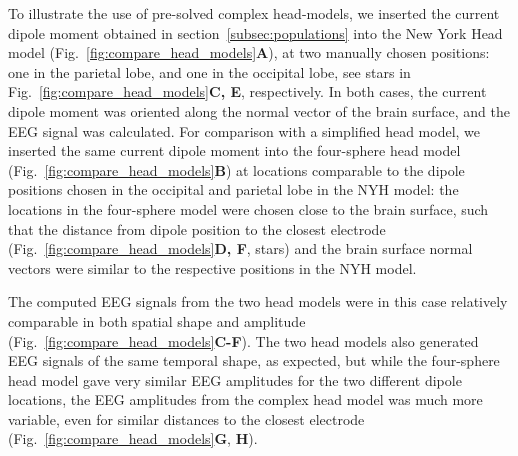 \documentclass[preprint,10pt,authoryear]{elsarticle}
\newcommand{\hlb}[2][NavyBlue]{ {\sethlcolor{#1} \hl{#2}} }
\newcommand{\hlg}[2][Emerald]{ {\sethlcolor{#1} \hl{#2}} }
\newcommand{\snnote}[1]{\color{white}{\hlb{SN: #1 }}\color{black}}
\newcommand{\tvnnote}[1]{\color{white}{\hlg{TVN: #1 }}\color{black}}
\begin{document}

To illustrate the use of pre-solved complex head-models, we inserted the current dipole moment obtained in section~\ref{subsec:populations} into the New York Head model (Fig.~\ref{fig:compare_head_models}\textbf{A}), at two manually chosen positions: one in the parietal lobe, and one in the occipital lobe, see stars in Fig.~\ref{fig:compare_head_models}\textbf{C, E}, respectively.
	In both cases, the current dipole moment was oriented along the normal vector of the brain surface, and the EEG signal was calculated.
For comparison with a simplified head model, we inserted the same current dipole moment into the four-sphere head model  (Fig.~\ref{fig:compare_head_models}\textbf{B}) at locations comparable to the dipole positions chosen in the occipital and parietal lobe in the NYH model: the locations in the four-sphere model were chosen close to the brain surface, such that the distance from dipole position to the closest electrode (Fig.~\ref{fig:compare_head_models}\textbf{D, F}, stars) and the brain surface normal vectors were similar to the respective positions in the NYH model.

The computed EEG signals from the two head models were in this case relatively comparable in both spatial shape and amplitude (Fig.~\ref{fig:compare_head_models}\textbf{C-F}). The two head models also generated EEG signals of the same temporal shape, as expected, but while the four-sphere head model gave very similar EEG amplitudes for the two different dipole locations, the EEG amplitudes from the complex head model was much more variable, even for similar distances to the closest electrode (Fig.~\ref{fig:compare_head_models}{\bf G}, {\bf H}).
\end{document}
